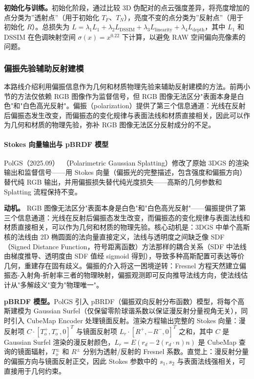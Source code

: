 \textbf{初始化与训练。}初始化阶段，通过比较 3D 伪配对的点云强度差异，将亮度增加的点分类为”透射点”（用于初始化 $T_F$、$T_N$），亮度不变的点分类为”反射点”（用于初始化 $R$）。总损失为 $L = \lambda_1 L_1 + \lambda_2 L_{\text{DSSIM}} + \lambda_3 L_{\text{linearity}} + \lambda_4 L_{\text{depth}}$，其中 $L_1$ 和 DSSIM 在色调映射空间 $\sigma(x)=x^{0.22}$ 下计算，以避免 RAW 空间偏向亮像素的问题。

\subsubsection{偏振先验辅助反射建模}

本路线介绍利用偏振信息作为几何和材质物理先验来辅助反射建模的方法。前两小节的方法仅依赖 RGB 图像作为监督信号，但 RGB 图像无法区分"表面本身是白色"和"白色高光反射"。偏振（polarization）提供了第三个信息通道：光线在反射后偏振态发生改变，而偏振态的变化规律与表面法线和材质直接相关，因此可以作为几何和材质的物理先验，弥补 RGB 图像无法区分反射成分的不足。

\paragraph{Stokes 向量输出与 pBRDF 模型}

PolGS（2025.09）~\cite{2509_19726}（Polarimetric Gaussian Splatting）修改了原始 3DGS 的渲染输出和监督信号——用 Stokes 向量（偏振光的完整描述，包含强度和偏振方向）替代纯 RGB 输出，并用偏振损失替代纯光度损失——高斯的几何参数和 Splatting 流程保持不变。

\textbf{动机。} RGB 图像无法区分"表面本身是白色"和"白色高光反射"——偏振提供了第三个信息通道：光线在反射后偏振态发生改变，而偏振态的变化规律与表面法线和材质直接相关，可以作为几何和材质的物理先验。核心动机是：3DGS 中单个高斯核的法线由 2D 椭圆面的法向量直接定义，法线与透明度之间缺乏像 SDF（Signed Distance Function，符号距离函数）方法那样的耦合关系（SDF 中法线由梯度推导、透明度由 SDF 值经 sigmoid 得到），导致多种高斯配置可表达等价几何，重建存在固有歧义。偏振的介入将这一困境逆转：Fresnel 方程天然建立偏振态-入射角-折射率三者的物理映射，偏振观测即可反向推导法线方向，使法线估计从"多解歧义"变为"物理唯一"。

\textbf{pBRDF 模型。}PolGS 引入 pBRDF（偏振双向反射分布函数）模型，将每个高斯建模为 Gaussian Surfel（仅保留零阶球谐系数以保证漫反射分量视角无关），同时引入 CubeMap Encoder 处理镜面反射。渲染方程输出完整的 Stokes 向量：漫反射项 $C \cdot [T_o^+, T_o^-, 0]^T$ 与镜面反射项 $L_r \cdot [R^+, -R^-, 0]^T$ 之和，其中 $C$ 是 Gaussian Surfel 渲染的漫反射颜色，$L_r = E(r_d - 2(r_d \cdot n)n)$ 是 CubeMap 查询的镜面辐射，$T_o^{\pm}$ 和 $R^{\pm}$ 分别为透射/反射的 Fresnel 系数。直觉上：漫反射分量的偏振方向与镜面反射正交，因此 Stokes 参数中的 $s_1, s_2$ 与表面法线强相关，可直接用于几何约束。

